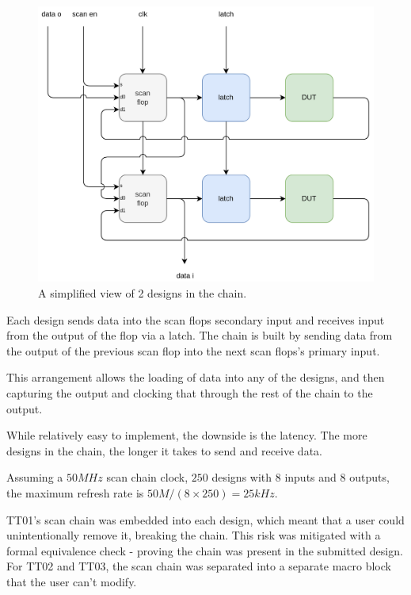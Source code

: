 \begin{figure}[htp]
\centering
\includegraphics[width=\columnwidth]{./Figs/scanchain_block_diagram.png}
\caption{A simplified view of 2 designs in the chain.}
\label{fig:simplified_view_2_designs}
\end{figure}

Each design sends data into the scan flops secondary input and receives input from the output of the flop via a latch.
The chain is built\cite{updateiodesign} by sending data from the output of the previous scan flop into the next scan flops’s primary input.

This arrangement allows the loading of data into any of the designs, and then capturing the output and clocking that through the rest of the chain to the output.

While relatively easy to implement, the downside is the latency.
The more designs in the chain, the longer it takes to send and receive data.

Assuming a \(50 MHz\) scan chain clock, \(250\) designs with \(8\) inputs and \(8\) outputs, the maximum refresh rate is \(50M / (8 \times 250) = 25kHz\).

TT01’s scan chain was embedded into each design, which meant that a user could unintentionally remove it, breaking the chain.
This risk was mitigated with a formal\cite{tinytapeoutscan} equivalence check - proving the chain was present in the submitted design.
For TT02 and TT03, the scan chain was separated into a separate macro block that the user can’t modify.

